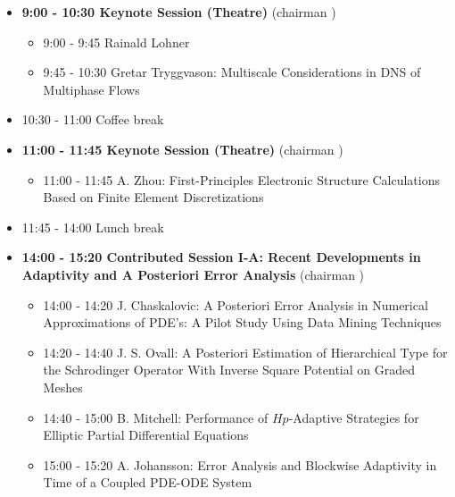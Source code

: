 \documentclass[10pt, A4]{article}%
\begin{document}
\begin{itemize}    
  \item {\bf 9:00 - 10:30 Keynote Session (Theatre)} (chairman ) 
  \begin{itemize}
    \item 9:00 - 9:45 {Rainald Lohner}
    \item 9:45 - 10:30 {Gretar Tryggvason}: {Multiscale Considerations in DNS of Multiphase Flows}
  \end{itemize}
  \item 10:30 - 11:00 Coffee break
  \item {\bf 11:00 - 11:45 Keynote Session (Theatre)} (chairman ) 
  \begin{itemize}
    \item 11:00 - 11:45 {A. Zhou}: {First-Principles Electronic Structure Calculations Based on Finite Element Discretizations}
  \end{itemize}
  \item 11:45 - 14:00 Lunch break      
  \item {\bf 14:00 - 15:20 Contributed Session I-A: Recent Developments in Adaptivity and A Posteriori Error Analysis} (chairman ) 
  \begin{itemize}
    \item 14:00 - 14:20 {J. Chaskalovic}: {A Posteriori Error Analysis in Numerical Approximations of PDE's: A Pilot Study Using Data Mining Techniques}
    \item 14:20 - 14:40 {J. S. Ovall}: {A Posteriori Estimation of Hierarchical Type for the  Schrodinger Operator With Inverse Square Potential on Graded Meshes}
    \item 14:40 - 15:00 {B. Mitchell}: {Performance of $Hp$-Adaptive Strategies for Elliptic Partial Differential Equations}
    \item 15:00 - 15:20 {A. Johansson}: {Error Analysis and Blockwise Adaptivity in Time of a Coupled PDE-ODE System} 


\end{itemize}
\end{itemize}
\end{document}
